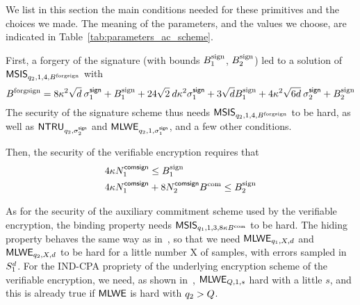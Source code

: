 
We list in this section the main conditions needed for these primitives and 
the choices we made. The meaning of the parameters, and the values we 
choose, are indicated in Table~\ref{tab:parameters_ac_scheme}. 


First, a forgery of the signature (with bounds $B^{\text{sign}}_1$, $B^{\text{sign}}_2$) led 
to a solution of $\mathsf{MSIS}_{q_2, 1, 4, B^{\text{forgsign}}}$ with
\[  B^{\text{forgsign}} =  8\kappa^2 \sqrt{d}\:\sigma^{\mathsf{sign}}_1 + B^{\text{sign}}_1 +
24\sqrt{2}\:d\kappa^2 \sigma^{\mathsf{sign}}_1 +
    3\sqrt{d}B^{\text{sign}}_1 + 4 \kappa^2 \sqrt{6d}\:\sigma^{\mathsf{sign}}_2 + B^{\text{sign}}_2 
\] 
	The security of the signature scheme thus needs $\mathsf{MSIS}_{q_2, 1, 4, 
B^{\text{forgsign}}}$ to be hard, as well as $\mathsf{NTRU}_{q_2,\sigma^{\mathsf{sign}}_2}$ and 
$\mathsf{MLWE}_{q_2,1,\sigma^{\mathsf{sign}}_1}$, and a few other conditions.

Then, the security of the verifiable encryption
requires that
\begin{equation} \begin{split}
        &4 \kappa N^{\mathsf{comsign}}_1  \leq B^{\text{sign}}_1 \\
        &4\kappa N^{\mathsf{comsign}}_1 + 8 N^{\mathsf{comsign}}_2 B^{\text{com}} \leq B^{\text{sign}}_2
    \end{split} \end{equation}

As for the security of the auxiliary commitment scheme used by 
the verifiable encryption, the binding property needs
$\mathsf{MSIS}_{q_1, 1,3,8\kappa B^{\text{com}}}$ to be hard.
The hiding property behaves the same way as in~\cite{CCS:delLyuSei18}, so 
that we need $\mathsf{MLWE}_{q_1,X,d}$ and $\mathsf{MLWE}_{q_2, X, d}$ to be hard for a 
little number X of samples, with errors sampled in $S_{1}^d$.
	For the IND-CPA propriety of the underlying encryption scheme of the 
verifiable encryption, we need, as shown in~\cite{EC:LyuNev17}, 
$\mathsf{MLWE}_{Q,1,s}$ hard with a little $s$, and this is already true if $\mathsf{MLWE}$ is 
hard with $q_2 > Q$.

